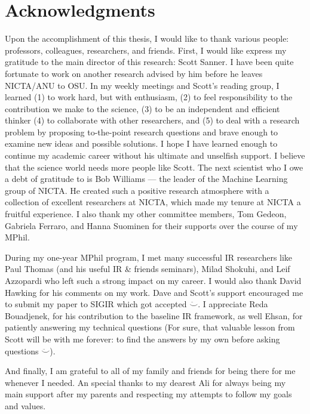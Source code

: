 \chapter*{Acknowledgments}

Upon the accomplishment of this thesis, I would like to thank various people: 
professors, colleagues, researchers, and friends. First, I would like express my gratitude to the main director of this research: Scott Sanner. I have been quite fortunate to work on another research advised by him before he leaves NICTA/ANU to OSU. In my weekly meetings and Scott's reading group,  I learned  (1) to work hard, but with enthusiasm, (2) to feel responsibility to the contribution we make to the science, (3) to be an independent and efficient thinker (4)  to collaborate with other researchers, and (5) to deal with a research problem by proposing to-the-point research questions and brave enough to examine new ideas and possible solutions. I hope I have learned enough to continue my academic career without his ultimate and unselfish support. I believe that the science world needs more people like Scott. The next scientist who I owe a debt of gratitude to is Bob Williams --- the leader of the Machine Learning group of NICTA. He created such a positive research atmosphere with a collection of excellent researchers at NICTA, which made my tenure at NICTA a fruitful experience.
I also thank my other committee members, Tom Gedeon, Gabriela Ferraro, and Hanna Suominen for their supports over the course of my MPhil.

During my one-year MPhil program, I met many successful IR researchers like Paul Thomas (and his useful IR \& friends seminars), Milad Shokuhi, and Leif Azzopardi who left such a strong impact on my career.  I would also thank David Hawking for his comments on my work. Dave and Scott's support encouraged me to submit my paper to SIGIR which got accepted $\ddot\smile$. 
I appreciate Reda Bouadjenek, for his contribution to the baseline IR framework, as well Ehsan, for patiently answering my technical questions (For sure, that valuable lesson from Scott will be with me forever: to find the answers by my own before asking questions $\ddot\smile$).

And finally, I am grateful to all of my family and friends for being there for me whenever I needed. An special thanks to my dearest Ali for always being my main support after my parents and respecting my attempts to follow my goals and values. 
